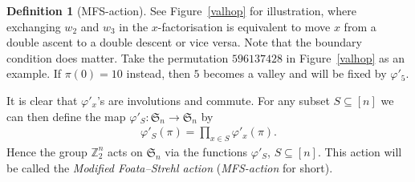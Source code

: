 \documentclass[12pt,reqno]{amsart}
\numberwithin{equation}{section}
\theoremstyle{plain}
\theoremstyle{definition}
\newtheorem{Def}[theorem]{Definition}
\def\Z{\mathbb{Z}}
\def\S{\mathfrak{S}}
\begin{document}
\begin{Def}[MFS-action]
See Figure~\ref{valhop} for illustration, where  exchanging
$w_2$ and  $w_3$ in the $x$-factorisation is equivalent to
move $x$  from a double ascent to  a double descent or vice versa. Note that the boundary condition does matter. Take the permutation $596137428$ in Figure~\ref{valhop} as an example.
If $\pi(0)=10$ instead, then $5$ becomes a valley and will be fixed by $\varphi'_5$.

It is clear that $\varphi'_x$'s are involutions and commute. For any subset $S\subseteq[n]$ we can then define the map $\varphi'_S :\S_n\rightarrow\S_n$ by
\begin{align*}
\varphi'_S(\pi)=\prod_{x\in S}\varphi'_x(\pi).
\end{align*}
Hence the group $\Z_2^n$ acts on $\S_n$ via the functions $\varphi'_S$, $S\subseteq[n]$. This action will be called  the {\em Modified Foata--Strehl action} ({\em MFS-action} for short).
\end{Def}
\end{document}

